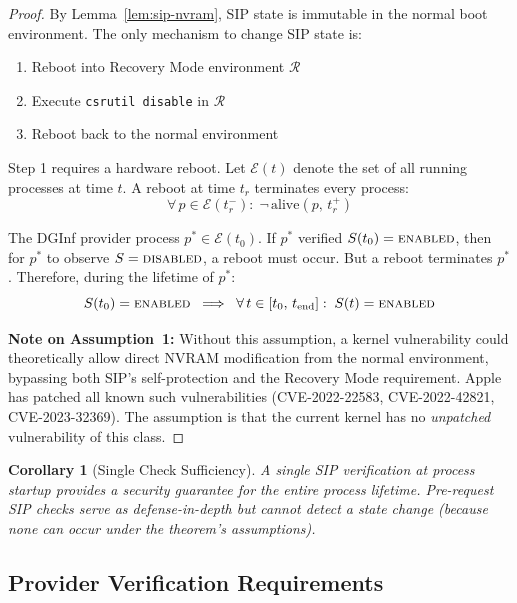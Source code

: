 \documentclass[10pt,twocolumn,letterpaper]{article}
\newtheorem{corollary}{Corollary}
\begin{document}
\begin{proof}
By Lemma~\ref{lem:sip-nvram}, SIP state is immutable in the normal boot environment. The only mechanism to change SIP state is:
\begin{enumerate}[leftmargin=*,itemsep=1pt]
    \item Reboot into Recovery Mode environment $\mathcal{R}$
    \item Execute \texttt{csrutil disable} in $\mathcal{R}$
    \item Reboot back to the normal environment
\end{enumerate}

Step 1 requires a hardware reboot. Let $\mathcal{E}(t)$ denote the set of all running processes at time $t$. A reboot at time $t_r$ terminates every process:
\begin{equation}
    \forall\, p \in \mathcal{E}(t_r^-):\; \lnot\,\text{alive}(p,\, t_r^+)
\end{equation}

The DGInf provider process $p^* \in \mathcal{E}(t_0)$. If $p^*$ verified $S(t_0) = \textsc{enabled}$, then for $p^*$ to observe $S = \textsc{disabled}$, a reboot must occur. But a reboot terminates $p^*$. Therefore, during the lifetime of $p^*$:
\begin{equation}
    S(t_0) = \textsc{enabled} \;\implies\; \forall\, t \in [t_0,\, t_{\text{end}}]:\; S(t) = \textsc{enabled}
\end{equation}

\textbf{Note on Assumption~1:} Without this assumption, a kernel vulnerability could theoretically allow direct NVRAM modification from the normal environment, bypassing both SIP's self-protection and the Recovery Mode requirement. Apple has patched all known such vulnerabilities (CVE-2022-22583, CVE-2022-42821, CVE-2023-32369). The assumption is that the current kernel has no \emph{unpatched} vulnerability of this class.
\end{proof}

\begin{corollary}[Single Check Sufficiency]
A single SIP verification at process startup provides a security guarantee for the entire process lifetime. Pre-request SIP checks serve as defense-in-depth but cannot detect a state change (because none can occur under the theorem's assumptions).
\end{corollary}

\subsection{Provider Verification Requirements}
\end{document}
